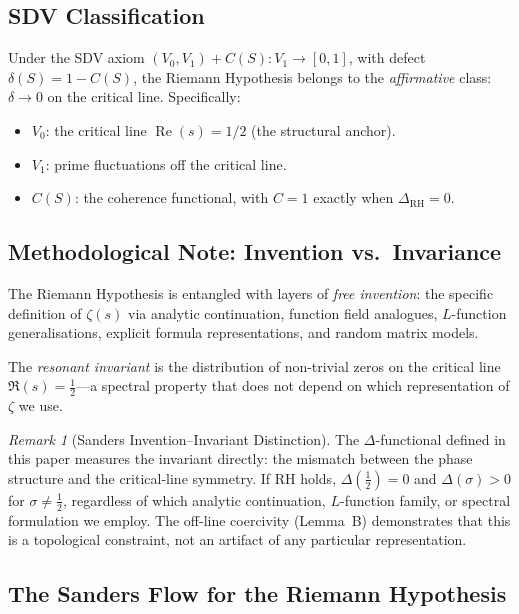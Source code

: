 \documentclass[11pt]{article}
\theoremstyle{remark}
\newtheorem{remark}[theorem]{Remark}
\DeclareMathOperator{\Rea}{Re}
\begin{document}
\subsection{SDV Classification}

Under the SDV axiom $(V_0,V_1)+C(S)\colon V_1\to[0,1]$, with defect
$\delta(S)=1-C(S)$, the Riemann Hypothesis belongs to the \emph{affirmative} class:
$\delta\to 0$ on the critical line.
Specifically:
\begin{itemize}
  \item $V_0$: the critical line $\Rea(s)=1/2$ (the structural anchor).
  \item $V_1$: prime fluctuations off the critical line.
  \item $C(S)$: the coherence functional, with $C=1$ exactly when
    $\Delta_{\mathrm{RH}}=0$.
\end{itemize}

\subsection*{Methodological Note: Invention vs.\ Invariance}

The Riemann Hypothesis is entangled with layers of \emph{free invention}: the specific
definition of $\zeta(s)$ via analytic continuation, function field analogues,
$L$-function generalisations, explicit formula representations, and random matrix
models.

The \emph{resonant invariant} is the distribution of non-trivial zeros on the
critical line $\Re(s) = \tfrac{1}{2}$---a spectral property that does not depend on
which representation of $\zeta$ we use.

\begin{remark}[Sanders Invention--Invariant Distinction]
The $\Delta$-functional defined in this paper measures the invariant directly:
the mismatch between the phase structure and the critical-line symmetry.
If RH holds, $\Delta(\tfrac{1}{2}) = 0$ and $\Delta(\sigma) > 0$ for
$\sigma \neq \tfrac{1}{2}$, regardless of which analytic continuation,
$L$-function family, or spectral formulation we employ. The off-line
coercivity (Lemma~B) demonstrates that this is a topological constraint,
not an artifact of any particular representation.
\end{remark}

\subsection*{The Sanders Flow for the Riemann Hypothesis}
\end{document}
